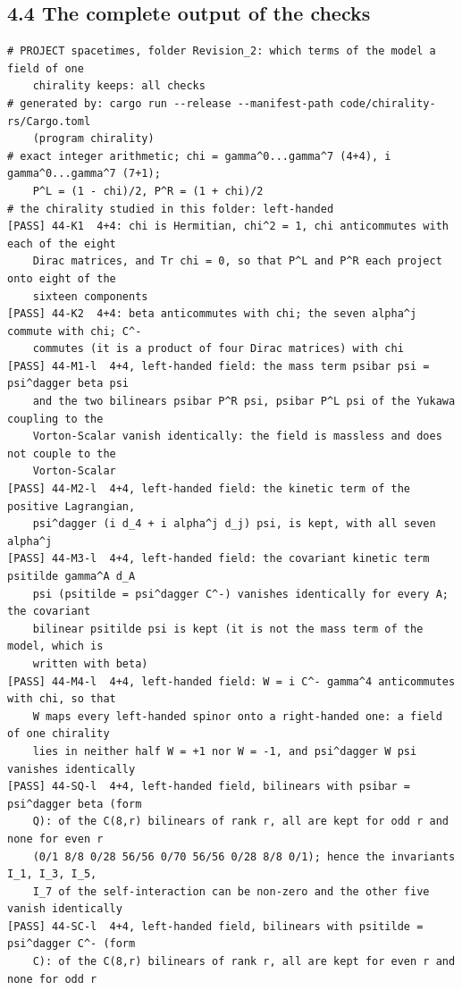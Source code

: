 \documentclass[
  10pt,
]{article}
\begin{document}
\hypertarget{the-complete-output-of-the-checks}{%
\subsection{4.4 The complete output of the
checks}\label{the-complete-output-of-the-checks}}

\begin{verbatim}
# PROJECT spacetimes, folder Revision_2: which terms of the model a field of one
    chirality keeps: all checks
# generated by: cargo run --release --manifest-path code/chirality-rs/Cargo.toml
    (program chirality)
# exact integer arithmetic; chi = gamma^0...gamma^7 (4+4), i gamma^0...gamma^7 (7+1);
    P^L = (1 - chi)/2, P^R = (1 + chi)/2
# the chirality studied in this folder: left-handed
[PASS] 44-K1  4+4: chi is Hermitian, chi^2 = 1, chi anticommutes with each of the eight
    Dirac matrices, and Tr chi = 0, so that P^L and P^R each project onto eight of the
    sixteen components
[PASS] 44-K2  4+4: beta anticommutes with chi; the seven alpha^j commute with chi; C^-
    commutes (it is a product of four Dirac matrices) with chi
[PASS] 44-M1-l  4+4, left-handed field: the mass term psibar psi = psi^dagger beta psi
    and the two bilinears psibar P^R psi, psibar P^L psi of the Yukawa coupling to the
    Vorton-Scalar vanish identically: the field is massless and does not couple to the
    Vorton-Scalar
[PASS] 44-M2-l  4+4, left-handed field: the kinetic term of the positive Lagrangian,
    psi^dagger (i d_4 + i alpha^j d_j) psi, is kept, with all seven alpha^j
[PASS] 44-M3-l  4+4, left-handed field: the covariant kinetic term psitilde gamma^A d_A
    psi (psitilde = psi^dagger C^-) vanishes identically for every A; the covariant
    bilinear psitilde psi is kept (it is not the mass term of the model, which is
    written with beta)
[PASS] 44-M4-l  4+4, left-handed field: W = i C^- gamma^4 anticommutes with chi, so that
    W maps every left-handed spinor onto a right-handed one: a field of one chirality
    lies in neither half W = +1 nor W = -1, and psi^dagger W psi vanishes identically
[PASS] 44-SQ-l  4+4, left-handed field, bilinears with psibar = psi^dagger beta (form
    Q): of the C(8,r) bilinears of rank r, all are kept for odd r and none for even r
    (0/1 8/8 0/28 56/56 0/70 56/56 0/28 8/8 0/1); hence the invariants I_1, I_3, I_5,
    I_7 of the self-interaction can be non-zero and the other five vanish identically
[PASS] 44-SC-l  4+4, left-handed field, bilinears with psitilde = psi^dagger C^- (form
    C): of the C(8,r) bilinears of rank r, all are kept for even r and none for odd r

\end{verbatim}
\end{document}
